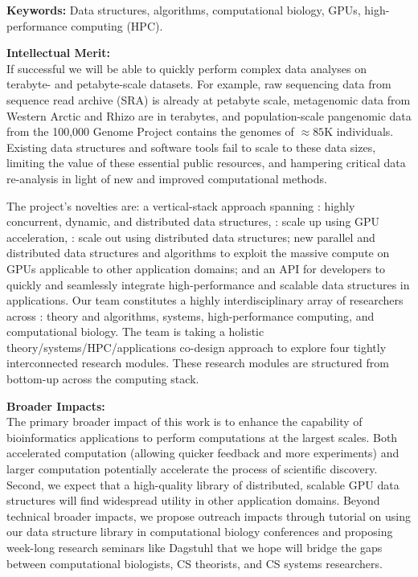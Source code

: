 \noindent \textbf{\large Keywords:} Data structures, algorithms, computational
biology, GPUs, high-performance computing (HPC).

\noindent \textbf{\large Intellectual Merit:}\\
If successful we will be able to quickly perform complex data analyses on terabyte- and petabyte-scale datasets. For example, raw sequencing data from sequence read archive (SRA) is already at petabyte scale, metagenomic data from Western Arctic and Rhizo are in terabytes, and population-scale pangenomic data from the 100,000 Genome Project contains the genomes of $\approx85$K individuals. Existing data structures and software tools fail to scale to these data sizes, limiting the value of these essential public resources, and hampering critical data re-analysis in light of new and improved computational methods.

The project’s novelties are: a vertical-stack approach spanning : highly concurrent, dynamic, and distributed data structures,
: scale up using GPU acceleration, : scale out using distributed data structures; new parallel and
distributed data structures and algorithms to exploit the massive compute on
GPUs applicable to other application domains; and an API for developers to
quickly and seamlessly integrate high-performance and scalable data structures
in applications.
%
Our team constitutes a highly interdisciplinary array of researchers across : theory and algorithms, systems, high-performance computing, and computational biology. The team is taking a holistic theory/systems/HPC/applications co-design approach to explore four tightly interconnected research modules. These research modules are structured from bottom-up across the computing stack.

\noindent \textbf{\large Broader Impacts: }\\
The primary broader impact of this work is to enhance the capability of
bioinformatics applications to perform computations at the largest scales. Both
accelerated computation (allowing quicker feedback and more experiments) and
larger computation potentially accelerate the process of scientific discovery.
Second, we expect that a high-quality library of distributed, scalable GPU data
structures will find widespread utility in other application domains.
%
Beyond technical broader impacts, we propose outreach impacts through tutorial
on using our data structure library in computational biology conferences and
proposing week-long research seminars like Dagstuhl that we hope will bridge
the gaps between computational biologists, CS theorists, and CS systems
researchers. 
